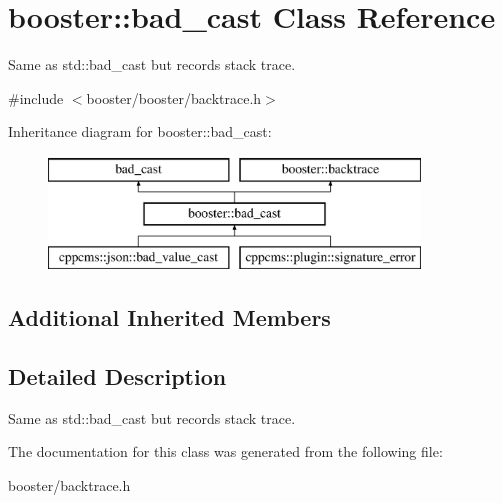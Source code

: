 \section{booster\+:\+:bad\+\_\+cast Class Reference}
\label{classbooster_1_1bad__cast}


Same as std\+::bad\+\_\+cast but records stack trace.  




{\ttfamily \#include $<$booster/booster/backtrace.\+h$>$}

Inheritance diagram for booster\+:\+:bad\+\_\+cast\+:\begin{figure}[H]
\begin{center}
\leavevmode
\includegraphics[height=3.000000cm]{classbooster_1_1bad__cast}
\end{center}
\end{figure}
\subsection*{Additional Inherited Members}


\subsection{Detailed Description}
Same as std\+::bad\+\_\+cast but records stack trace. 

The documentation for this class was generated from the following file\+:\begin{DoxyCompactItemize}
\item 
booster/backtrace.\+h\end{DoxyCompactItemize}
